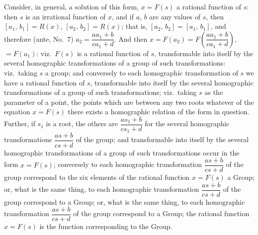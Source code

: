 \documentclass[11pt]{article}
\begin{document}
\newpage
Consider, in general, a solution of this form, $x = F(s)$ a rational function of $s$: then
$s$ is an irrational function of $x$, and if $a$, $b$ are any values of $s$, then $[a_{1},\,b_{1}] = R(x)$,
$[a_{2},\,b_{2}] = R(x)$; that is, $[a_{2},\,b_{2}] = [a_{1},\,b_{1}]$, and therefore (ante, No.\ 7) $a_{2} = \dfrac{a a_{1} + b}{c a_{1} + d}$. And
then $x = F(a_{2}) = F\!\left(\dfrac{a a_{1} + b}{c a_{1} + d}\right)$, $= F(a_{1})$: viz.\ $F(s)$ is a rational function of $s$, transformable into itself by the several homographic transformations of a group of
such transformations: viz.\ taking $s$ a group; and conversely to each homographic transformation of $s$ we have a rational function of $s$, transformable into itself by the several homographic transformations of a group of
such transformations; viz.\ taking $s$ as the parameter of a point, the points which are
between any two roots whatever of the equation $x = F(s)$ there exists a homographic
relation of the form in question. Further, if $s_{1}$ is a root, the others are
$\dfrac{a s_{1} + b}{c s_{1} + d}$ for the several homographic transformations $\dfrac{a s + b}{c s + d}$ of the group; and
transformable into itself by the several homographic transformations of a group of
such transformations occur in the form $x = F(s)$; conversely to each homographic transformation $\dfrac{a s + b}{c s + d}$ of the group correspond to the six elements of the
rational function $x = F(s)$ a Group; or, what is the same thing, to each homographic transformation $\dfrac{a s + b}{c s + d}$ of the group correspond to a Group; or, what is the same thing, to each homographic transformation $\dfrac{a s + b}{c s + d}$ of the group correspond to a Group; the rational function $x = F(s)$ is the function corresponding to the Group.
\end{document}
